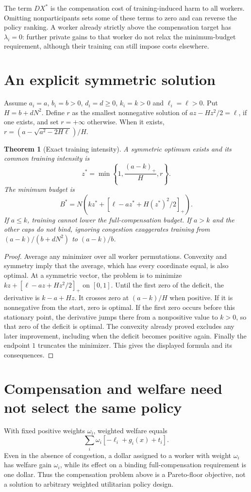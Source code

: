 \documentclass[11pt]{article}
\newtheorem{theorem}{Theorem}
\theoremstyle{remark}\newtheorem{remark}[theorem]{Remark}
\begin{document}
The term $DX^*$ is the compensation cost of training-induced harm to all workers. Omitting nonparticipants sets some of these terms to zero and can reverse the policy ranking. A worker already strictly above the compensation target has $\lambda_i=0$: further private gains to that worker do not relax the minimum-budget requirement, although their training can still impose costs elsewhere.

\section*{An explicit symmetric solution}
Assume $a_i=a$, $b_i=b>0$, $d_i=d\ge0$, $k_i=k>0$ and $\ell_i=\ell>0$. Put $H=b+dN^2$. Define $r$ as the smallest nonnegative solution of $az-Hz^2/2=\ell$, if one exists, and set $r=+\infty$ otherwise. When it exists,
$r=(a-\sqrt{a^2-2H\ell})/H$.

\begin{theorem}[Exact training intensity]
A symmetric optimum exists and its common training intensity is
\[
 z^*=\min\left\{1,\frac{(a-k)_+}{H},r\right\}.
\]
The minimum budget is
\[
 B^*=N\left(kz^*+[\ell-az^*+H(z^*)^2/2]_+\right).
\]
If $a\le k$, training cannot lower the full-compensation budget. If $a>k$ and the other caps do not bind, ignoring congestion exaggerates training from $(a-k)/(b+dN^2)$ to $(a-k)/b$.
\end{theorem}
\begin{proof}
Average any minimizer over all worker permutations. Convexity and symmetry imply that the average, which has every coordinate equal, is also optimal. At a symmetric vector, the problem is to minimize $kz+[\ell-az+Hz^2/2]_+$ on $[0,1]$. Until the first zero of the deficit, the derivative is $k-a+Hz$. It crosses zero at $(a-k)/H$ when positive. If it is nonnegative from the start, zero is optimal. If the first zero occurs before this stationary point, the derivative jumps there from a nonpositive value to $k>0$, so that zero of the deficit is optimal. The convexity already proved excludes any later improvement, including when the deficit becomes positive again. Finally the endpoint $1$ truncates the minimizer. This gives the displayed formula and its consequences.
\end{proof}

\section*{Compensation and welfare need not select the same policy}
With fixed positive weights $\omega_i$, weighted welfare equals
\[
 \sum_i\omega_i[-\ell_i+g_i(x)+t_i].
\]
Even in the absence of congestion, a dollar assigned to a worker with weight $\omega_i$ has welfare gain $\omega_i$, while its effect on a binding full-compensation requirement is one dollar. Thus the compensation problem above is a Pareto-floor objective, not a solution to arbitrary weighted utilitarian policy design.
\end{document}
